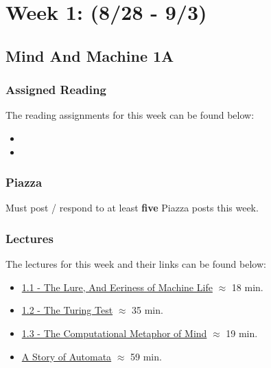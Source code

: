 \clearpage
\chapter{Week 1: (8/28 - 9/3)}

\section{Mind And Machine 1A}

\subsection{Assigned Reading}

The reading assignments for this week can be found below:

\begin{itemize}
    \item {}
    \item {}
\end{itemize}

\subsection{Piazza}

Must post / respond to at least \textbf{five} Piazza posts this week.  

\subsection{Lectures}

The lectures for this week and their links can be found below:

\begin{itemize}
    \item \href{https://applied.cs.colorado.edu/mod/hvp/view.php?id=49313}{1.1 - The Lure, And Eeriness of Machine Life} $\approx$ 18 min.
    \item \href{https://applied.cs.colorado.edu/mod/hvp/view.php?id=49314}{1.2 - The Turing Test} $\approx$ 35 min.
    \item \href{https://applied.cs.colorado.edu/mod/hvp/view.php?id=49315}{1.3 - The Computational Metaphor of Mind} $\approx$ 19 min.
    \item \href{https://www.youtube.com/watch?v=YAg66jrvpHA}{A Story of Automata} $\approx$ 59 min.
\end{itemize}

